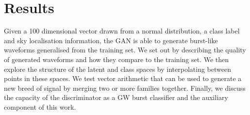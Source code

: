 \documentclass[12pt]{iopart}
\begin{document}

\section{Results}

Given a 100 dimensional vector drawn from a normal distribution, a class label and sky localisation information, the GAN is able to generate burst-like waveforms  generalised from the training set. We set out by describing the quality of generated waveforms and how they compare to the training set. We then explore the structure of the latent and class spaces by interpolating between points in these spaces. We test vector arithmetic that can be used to generate a new breed of signal by merging two or more families together. Finally, we discuss the capacity of the discriminator as a GW burst classifier and the auxiliary component of this work. 
\end{document}
